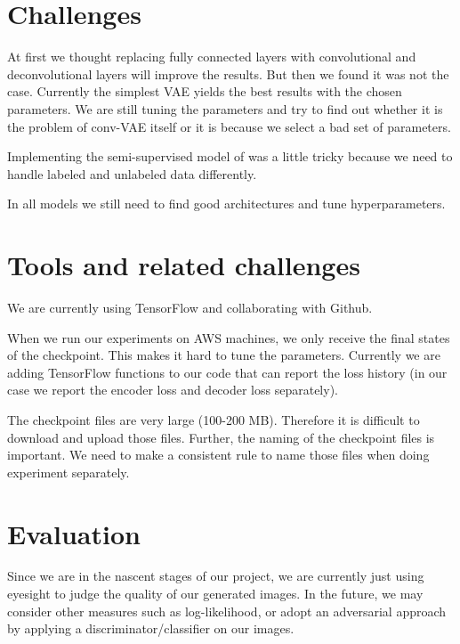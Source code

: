 \documentclass[11pt]{article}
\begin{document}
\section*{Challenges}

At first we thought replacing fully connected layers with convolutional and deconvolutional layers will improve the results. But then we found it was not the case. Currently the simplest VAE yields the best results with the chosen parameters. We are still tuning the parameters and try to find out whether it is the problem of conv-VAE itself or it is because we select a bad set of parameters.

Implementing the semi-supervised model of \cite{DBLP:journals/corr/KingmaRMW14} was a little tricky because we need to handle labeled and unlabeled data differently.

In all models we still need to find good architectures and tune hyperparameters.



\section*{Tools and related challenges}
We are currently using TensorFlow and collaborating with Github.

When we run our experiments on AWS machines, we only receive the final states of the checkpoint. This makes it hard to tune the parameters. Currently we are adding TensorFlow functions to our code that can report the loss history (in our case we report the encoder loss and decoder loss separately).

The checkpoint files are very large (100-200 MB). Therefore it is difficult to download and upload those files. Further, the naming of the checkpoint files is important. We need to make a consistent rule to name those files when doing experiment separately.

\section*{Evaluation}

Since we are in the nascent stages of our project, we are currently just using eyesight to judge the quality of our generated images. In the future, we may consider other measures such as log-likelihood, or adopt an adversarial approach by applying a discriminator/classifier on our images.




\end{document}
